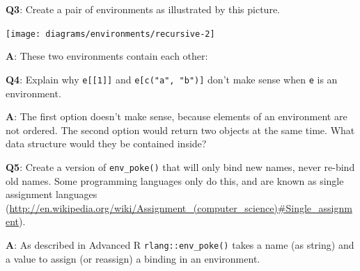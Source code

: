 \documentclass[
]{krantz}
\makeatletter
\newenvironment{Shaded}{\begin{snugshade}}{\end{snugshade}}
\newcommand{\CommentTok}[1]{\textcolor[rgb]{0.56,0.35,0.01}{\textit{#1}}}
\newcommand{\DecValTok}[1]{\textcolor[rgb]{0.00,0.00,0.81}{#1}}
\newcommand{\KeywordTok}[1]{\textcolor[rgb]{0.13,0.29,0.53}{\textbf{#1}}}
\newcommand{\NormalTok}[1]{#1}
\newcommand{\OperatorTok}[1]{\textcolor[rgb]{0.81,0.36,0.00}{\textbf{#1}}}
\newcommand{\StringTok}[1]{\textcolor[rgb]{0.31,0.60,0.02}{#1}}
\renewcommand{\href}[2]{#2 (\url{#1})}
\newenvironment{kframe}{%
\medskip{}
\setlength{\fboxsep}{.8em}
 \def\at@end@of@kframe{}%
 \ifinner\ifhmode%
  \def\at@end@of@kframe{\end{minipage}}%
  \begin{minipage}{\columnwidth}%
 \fi\fi%
 \def\FrameCommand##1{\hskip\@totalleftmargin \hskip-\fboxsep
 \colorbox{shadecolor}{##1}\hskip-\fboxsep
     \hskip-\linewidth \hskip-\@totalleftmargin \hskip\columnwidth}%
 \MakeFramed {\advance\hsize-\width
   \@totalleftmargin\z@ \linewidth\hsize
   \@setminipage}}%
 {\par\unskip\endMakeFramed%
 \at@end@of@kframe}
\renewenvironment{Shaded}{\begin{kframe}}{\end{kframe}}
\renewcommand{\KeywordTok} [1]{\textcolor[rgb]{0.00,0.44,0.13}{{#1}}}
\renewcommand{\DecValTok}  [1]{\textcolor[rgb]{0.25,0.63,0.44}{{#1}}}
\renewcommand{\StringTok}  [1]{\textcolor[rgb]{0.25,0.44,0.63}{{#1}}}
\renewcommand{\CommentTok} [1]{\textcolor[rgb]{0.38,0.63,0.69}{{#1}}}
\renewcommand{\NormalTok}  [1]{{#1}}
\makeatother
\begin{document}
\textbf{{Q3}}: Create a pair of environments as illustrated by this picture.

\begin{center}\texttt{[image: diagrams/environments/recursive-2]} \end{center}

\textbf{{A}}: These two environments contain each other:

\begin{Shaded}
\end{Shaded}

\textbf{{Q4}}: Explain why \texttt{e{[}{[}1{]}{]}} and \texttt{e{[}c("a",\ "b"){]}} don't make sense when \texttt{e} is an environment.

\textbf{{A}}: The first option doesn't make sense, because elements of an environment are not ordered. The second option would return two objects at the same time. What data structure would they be contained inside?

\textbf{{Q5}}: Create a version of \texttt{env\_poke()} that will only bind new names, never re-bind old names. Some programming languages only do this, and are known as \href{http://en.wikipedia.org/wiki/Assignment_(computer_science)\#Single_assignment}{single assignment languages}.

\textbf{{A}}: As described in Advanced R \texttt{rlang::env\_poke()} takes a name (as string) and a value to assign (or reassign) a binding in an environment.

\begin{Shaded}
\end{Shaded}
\end{document}
